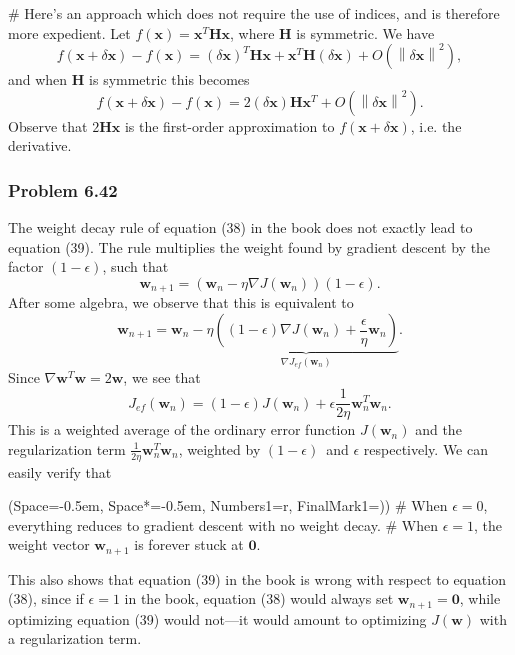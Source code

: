 \documentclass[12pt, a4paper]{article}
\newcommand{\listSpace}{-0.5em}%
\newcommand{\vect}[1]{\bm{#1}}
\newcommand{\norm}[1]{\left\lVert#1\right\rVert}
\begin{document}
{\begin{easylist}[enumerate]
	# Here's an approach which does not require the use of indices, and is therefore more expedient.
	Let $f(\vect{x}) = \vect{x}^T \vect{H} \vect{x}$, where $\vect{H}$ is symmetric.
	We have
	\begin{equation*}
		f(\vect{x} + \delta \vect{x}) - f( \vect{x}) = 
		\left( \delta \vect{x} \right)^T \vect{H} \vect{x} + 
		\vect{x}^T \vect{H} \left( \delta \vect{x} \right)
		+ O \left( \norm{ \delta \vect{x} }^2 \right),
	\end{equation*}
	and when $\vect{H}$ is symmetric this becomes 
	\begin{equation*}
			f(\vect{x} + \delta \vect{x}) - f( \vect{x}) = 
			2 \left( \delta \vect{x} \right)  \vect{H} \vect{x}^T
			+ O \left( \norm{ \delta \vect{x} }^2 \right).
	\end{equation*}
	Observe that $2 \vect{H} \vect{x}$ is the first-order approximation to  $f(\vect{x} + \delta \vect{x})$, i.e. the derivative.
	
\end{easylist}

\subsubsection*{Problem 6.42}
The weight decay rule of equation (38) in the book does not exactly lead to equation (39).
The rule multiplies the weight found by gradient descent by the factor $(1 - \epsilon)$, such that 
\begin{equation*}
	\vect{w}_{n+1} = \left( \vect{w}_{n} - \eta \nabla J(\vect{w}_n ) \right) (1 - \epsilon).
\end{equation*}
After some algebra, we observe that this is equivalent to
\begin{equation*}
		\vect{w}_{n+1} = \vect{w}_{n} - \eta  \underbrace{\left(
			(1 - \epsilon ) \nabla J(\vect{w}_n ) + \frac{\epsilon}{\eta} \vect{w}_n
			\right)}_{\nabla J_{ef}(\vect{w}_n)} .
\end{equation*}
Since $\nabla \vect{w}^T \vect{w} = 2 \vect{w}$, we see that
\begin{equation*}
J_{ef}(\vect{w}_n) = (1 - \epsilon ) J(\vect{w}_n ) + \epsilon \frac{1}{2 \eta} \vect{w}_n^T \vect{w}_n.
\end{equation*}
This is a weighted average of the ordinary error function $J(\vect{w}_n )$ and the regularization term $\frac{1}{2 \eta} \vect{w}_n^T \vect{w}_n$, weighted by $(1 - \epsilon )$ and $\epsilon$ respectively.
We can easily verify that 
\begin{easylist}[enumerate]
	\ListProperties(Space=\listSpace, Space*=\listSpace, Numbers1=r, FinalMark1={)})
	# When $\epsilon = 0$, everything reduces to gradient descent with no weight decay.
	# When $\epsilon = 1$, the weight vector $\vect{w}_{n+1}$ is forever stuck at $\vect{0}$.
\end{easylist}
This also shows that equation (39) in the book is wrong with respect to equation (38), since if $\epsilon=1$ in the book, equation (38) would always set $\vect{w}_{n+1} = \vect{0}$, while optimizing equation (39) would not---it would amount to optimizing $J(\vect{w} )$ with a regularization term.





}
\end{document}
